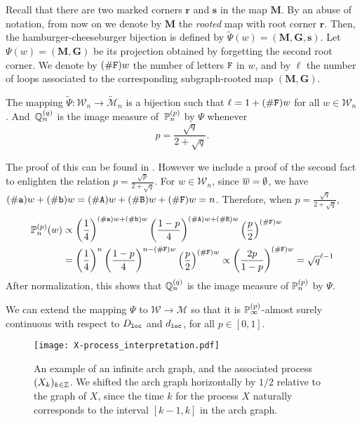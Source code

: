 \documentclass[a4paper]{article}
\newcommand*{\map}{\mathbf}
\newcommand*{\M}{\mathcal{M}}
\newcommand*{\W}{\mathcal{W}}
\newcommand*{\wt}{\widetilde}
\newcommand*{\m}{\map{M}}
\begin{document}
Recall that there are two marked corners $\map{r}$ and $\map{s}$ in the map $\m $.
By an abuse of notation, from now on we denote by $\m $ the \emph{rooted} map with root corner $\map{r}$.
Then, the hamburger-cheeseburger bijection is defined by $\wt{\Psi}(w) = (\map{M,G,s})$.
Let $\Psi(w) = (\map{M,G})$ be its projection obtained by forgetting the second root corner.
We denote by $\card{\xF}w$ the number of letters $\xF$ in $w$, and by $\ell$ the number of loops associated to the corresponding subgraph-rooted map $(\map{M,G})$.
\begin{thm} \label{thm:shebij}
The mapping $\wt{\Psi}:\!\W_n\!\to\!\wt{\M}_n$ is a bijection such that $\ell=1+\card{\xF}w$ for all $w\in\W_n$.
And $\,\proba[Q]\ind{q}_n$ is the image measure of $\,\proba\ind{p}_n$ by $\Psi$ whenever
$$p=\frac{\sqrt{q}}{2+\sqrt{q}}.$$
\end{thm}
\proof The proof of this can be found in \cite{She11}.
However we include a proof of the second fact to enlighten the relation $ p = \frac{ \sqrt{p}}{2 + \sqrt{q}}$.
For $w\in\W_n$, since $\rd{w}=\emptystr$, we have
			$\card\xa w + \card\xb w = \card\xA w + \card\xB w + \card\xF w = n$.
Therefore, when $p=\frac{\sqrt{q}}{2+\sqrt{q}}$,
		\begin{align*}
			\proba\ind{p}_n(w)
				&\propto\Par{\frac{1}{4}}^{\card\xa w + \card\xb w}
						 \Par{\frac{1-p}{4}}^{\card\xA w + \card\xB w}
						 \Par{\frac{p}{2}}^{\card\xF w}
			\\	&	=	\Par{\frac{1}{4}}^n
						\Par{\frac{1-p}{4}}^{n-\card\xF w}
						\Par{\frac{p}{2}}^{\card\xF w}
				\propto\Par{\frac{2p}{1-p}}^{\card\xF w}	= \sqrt{q}^{\ell-1}
		\end{align*}
After normalization, this shows that $\proba[Q]\ind{q}_n$ is the image measure of $\proba\ind{p}_n$ by $\Psi$.
\endproof 

\begin{prop} \label{prop:extcontinu}
We can extend the mapping $\Psi$ to $\W\to\M$ so that it is $\proba\ind{p}_\infty$-almost surely continuous with respect to $D\sub{loc}$ and $d\sub{loc}$, for all $p\in[0,1]$.
\end{prop}

\begin{figure}[t!]
\captionsetup{width=0.8\textwidth}
\begin{center}
\texttt{[image: X-process\_interpretation.pdf]}
\caption{An example of an infinite arch graph, and the associated process $(X_k)_{k\in\integer}$.
We shifted the arch graph horizontally by $1/2$ relative to the graph of $X$, since the time $k$ for the process $X$ naturally corresponds to the interval $[k-1,k]$ in the arch graph.}
\label{fig:interpretation of X}
\end{center}
\end{figure}
\end{document}
